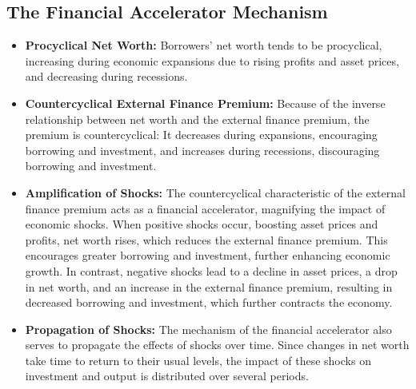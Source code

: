 \subsection{The Financial Accelerator Mechanism}
\begin{itemize}
    \item \textbf{Procyclical Net Worth:} Borrowers' net worth tends to be procyclical, increasing during economic expansions due to rising profits and asset prices, and decreasing during recessions.
    \item \textbf{Countercyclical External Finance Premium:} Because of the inverse relationship between net worth and the external finance premium, the premium is countercyclical: It decreases during expansions, encouraging borrowing and investment, and increases during recessions, discouraging borrowing and investment.
    \item \textbf{Amplification of Shocks:} The countercyclical characteristic of the external finance premium acts as a financial accelerator, magnifying the impact of economic shocks. When positive shocks occur, boosting asset prices and profits, net worth rises, which reduces the external finance premium. This encourages greater borrowing and investment, further enhancing economic growth. In contrast, negative shocks lead to a decline in asset prices, a drop in net worth, and an increase in the external finance premium, resulting in decreased borrowing and investment, which further contracts the economy.
    \item \textbf{Propagation of Shocks:} The mechanism of the financial accelerator also serves to propagate the effects of shocks over time. Since changes in net worth take time to return to their usual levels, the impact of these shocks on investment and output is distributed over several periods.
\end{itemize}

